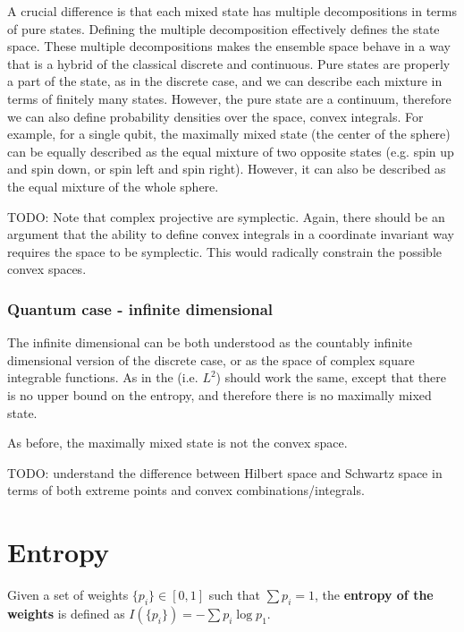 \documentclass[11pt]{article}
\begin{document}
A crucial difference is that each mixed state has multiple decompositions in terms of pure states. Defining the multiple decomposition effectively defines the state space. These multiple decompositions makes the ensemble space behave in a way that is a hybrid of the classical discrete and continuous. Pure states are properly a part of the state, as in the discrete case, and we can describe each mixture in terms of finitely many states. However, the pure state are a continuum, therefore we can also define probability densities over the space, convex integrals. For example, for a single qubit, the maximally mixed state (the center of the sphere) can be equally described as the equal mixture of two opposite states (e.g. spin up and spin down, or spin left and spin right). However, it can also be described as the equal mixture of the whole sphere.

TODO: Note that complex projective are symplectic. Again, there should be an argument that the ability to define convex integrals in a coordinate invariant way requires the space to be symplectic. This would radically constrain the possible convex spaces.

\subsubsection{Quantum case - infinite dimensional}

The infinite dimensional can be both understood as the countably infinite dimensional version of the discrete case, or as the space of complex square integrable functions. As in the  (i.e. $L^2$) should work the same, except that there is no upper bound on the entropy, and therefore there is no maximally mixed state.

As before, the maximally mixed state is not the convex space.

TODO: understand the difference between Hilbert space and Schwartz space in terms of both extreme points and convex combinations/integrals.

\section{Entropy}

\begin{defn}
	Given a set of weights $\{p_i\} \in [0,1]$ such that $\sum p_i = 1$, the \textbf{entropy of the weights} is defined as $I(\{p_i\}) = - \sum p_i \log p_1 $.
\end{defn}
\end{document}
